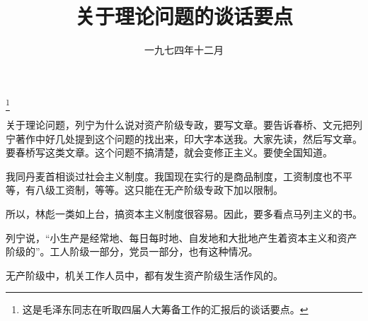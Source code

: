 
\title{关于理论问题的谈话要点}
\date{一九七四年十二月}
\thanks{这是毛泽东同志在听取四届人大筹备工作的汇报后的谈话要点。}
\maketitle


关于理论问题，列宁为什么说对资产阶级专政，要写文章。要告诉春桥、文元把列宁著作中好几处提到这个问题的找出来，印大字本送我。大家先读，然后写文章。要春桥写这类文章。这个问题不搞清楚，就会变修正主义。要使全国知道。

我同丹麦首相谈过社会主义制度。我国现在实行的是商品制度，工资制度也不平等，有八级工资制，等等。这只能在无产阶级专政下加以限制。

所以，林彪一类如上台，搞资本主义制度很容易。因此，要多看点马列主义的书。

列宁说，“小生产是经常地、每日每时地、自发地和大批地产生着资本主义和资产阶级的”。工人阶级一部分，党员一部分，也有这种情况。

无产阶级中，机关工作人员中，都有发生资产阶级生活作风的。

